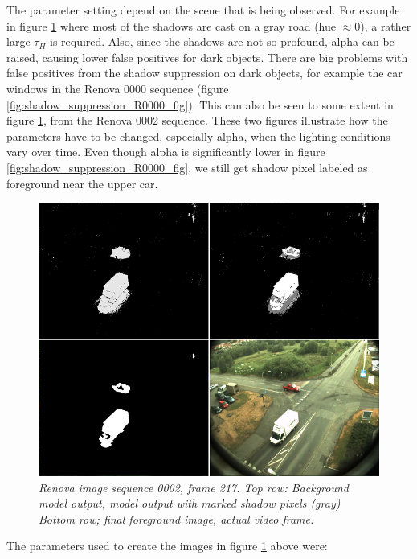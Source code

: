 The parameter setting depend on the scene that is being observed. For example in figure \ref{fig:shadow_suppression_R0002_fig} where most of the shadows are cast on a gray road (hue $\approx 0$), a rather large $\tau_H$ is required. Also, since the shadows are not so profound, alpha can be raised, causing lower false positives for dark objects. There are big problems with false positives from the shadow suppression on dark objects, for example the car windows in the Renova 0000 sequence (figure \ref{fig:shadow_suppression_R0000_fig}). This can also be seen to some extent in figure \ref{fig:shadow_suppression_R0002_fig}, from the Renova 0002 sequence. These two figures illustrate how the parameters have to be changed, especially alpha, when the lighting conditions vary over time. Even though alpha is significantly lower in figure \ref{fig:shadow_suppression_R0000_fig}, we still get shadow pixel labeled as foreground near the upper car.

\newpage
\begin{figure}[htb]
	\centering
	\includegraphics[width=\linewidth]{images/ShadowRenova0002.png}
	\caption{\textit{Renova image sequence 0002, frame 217. 
	\newline
	Top row: Background model output, model output with marked shadow pixels (gray) \newline
	Bottom row; final foreground image, actual video frame.}}
	\label{fig:shadow_suppression_R0002_fig}  %
\end{figure}

The parameters used to create the images in figure \ref{fig:shadow_suppression_R0002_fig} above were:

